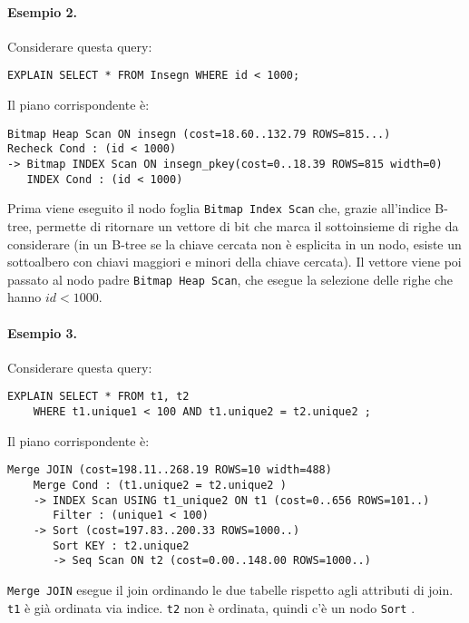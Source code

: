 \documentclass[a4paper, 10pt, titlepage]{article}
\begin{document}
	\paragraph{Esempio 2.} 
	Considerare questa query:
	\begin{lstlisting}
EXPLAIN SELECT * FROM Insegn WHERE id < 1000;
	\end{lstlisting}
	Il piano corrispondente è:
	\begin{lstlisting}
Bitmap Heap Scan ON insegn (cost=18.60..132.79 ROWS=815...)
Recheck Cond : (id < 1000)
-> Bitmap INDEX Scan ON insegn_pkey(cost=0..18.39 ROWS=815 width=0)
   INDEX Cond : (id < 1000)
	\end{lstlisting}
	Prima viene eseguito il nodo foglia \lstinline|Bitmap Index Scan| che, grazie all'indice B-tree, permette di ritornare un vettore di bit che marca il sottoinsieme di righe da considerare (in un B-tree se la chiave cercata non è esplicita in un nodo, esiste un sottoalbero con chiavi maggiori e minori della chiave cercata). Il vettore viene poi passato al nodo padre \lstinline|Bitmap Heap Scan|, che esegue la selezione delle righe che hanno $id < 1000$. 
	
	\paragraph{Esempio 3.}
		Considerare questa query:
	\begin{lstlisting}
EXPLAIN SELECT * FROM t1, t2
	WHERE t1.unique1 < 100 AND t1.unique2 = t2.unique2 ;
	\end{lstlisting}
	Il piano corrispondente è:
	\begin{lstlisting}
Merge JOIN (cost=198.11..268.19 ROWS=10 width=488)
	Merge Cond : (t1.unique2 = t2.unique2 )
	-> INDEX Scan USING t1_unique2 ON t1 (cost=0..656 ROWS=101..)
	   Filter : (unique1 < 100)
	-> Sort (cost=197.83..200.33 ROWS=1000..)
	   Sort KEY : t2.unique2
	   -> Seq Scan ON t2 (cost=0.00..148.00 ROWS=1000..)
	\end{lstlisting} \medskip
\lstinline|Merge JOIN| esegue il join ordinando le due tabelle rispetto agli attributi di join. \lstinline|t1| è già ordinata via indice.
\lstinline|t2| non è ordinata, quindi c’è un nodo \lstinline|Sort| .\medskip
\end{document}
